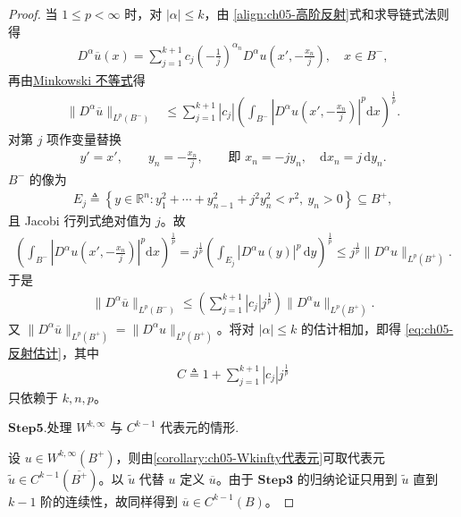 \documentclass[../../main.tex]{subfiles}
\begin{document}
\begin{proof}
当 $1\leqslant p<\infty$ 时，对 $|\alpha|\leqslant k$，由 \eqref{align:ch05-高阶反射}式和求导链式法则得
\begin{align}\label{HJKLVNLKAAA}
D^{\alpha}\overline{u}(x)=\sum_{j=1}^{k+1}c_j\left(-\frac{1}{j}\right)^{\alpha_n}
D^{\alpha}u\left(x',-\frac{x_n}{j}\right),\quad x\in B^{-},
\end{align}
再由\hyperref[Real Analysis-theorem:实变函数--Minkowski不等式]{Minkowski 不等式}得
\begin{align*}
\|D^{\alpha}\overline{u}\|_{L^{p}(B^{-})}
&\leqslant\sum_{j=1}^{k+1}|c_j|\left(\int_{B^{-}}\left|D^{\alpha}u\left(x',-\frac{x_n}{j}\right)\right|^{p}\mathrm{d}x\right)^{\frac{1}{p}}.
\end{align*}
对第 $j$ 项作变量替换
\begin{align*}
y'=x',\qquad y_n=-\frac{x_n}{j},\qquad\text{即 }x_n=-jy_n,\quad \mathrm{d}x_n=j\,\mathrm{d}y_n.
\end{align*}
$B^{-}$ 的像为
\begin{align*}
E_j\triangleq\left\{y\in\mathbb{R}^{n}:y_1^2+\cdots+y_{n-1}^2+j^2y_n^2<r^2,\ y_n>0\right\}\subseteq B^{+},
\end{align*}
且 Jacobi 行列式绝对值为 $j$。故
\begin{align*}
\left(\int_{B^{-}}\left|D^{\alpha}u\left(x',-\frac{x_n}{j}\right)\right|^{p}\mathrm{d}x\right)^{\frac{1}{p}}
=j^{\frac{1}{p}}\left(\int_{E_j}|D^{\alpha}u(y)|^{p}\,\mathrm{d}y\right)^{\frac{1}{p}}\leqslant j^{\frac{1}{p}}\|D^{\alpha}u\|_{L^{p}(B^{+})}.
\end{align*}
于是
\begin{align*}
\|D^{\alpha}\overline{u}\|_{L^{p}(B^{-})}
\leqslant\left(\sum_{j=1}^{k+1}|c_j|j^{\frac{1}{p}}\right)\|D^{\alpha}u\|_{L^{p}(B^{+})}.
\end{align*}
又 $\|D^{\alpha}\overline{u}\|_{L^{p}(B^{+})}=\|D^{\alpha}u\|_{L^{p}(B^{+})}$。将对 $|\alpha|\leqslant k$ 的估计相加，即得 \eqref{eq:ch05-反射估计}，其中
\begin{align*}
C\triangleq1+\sum_{j=1}^{k+1}|c_j|j^{\frac{1}{p}}
\end{align*}
只依赖于 $k,n,p$。

\noindent$\mathbf{Step}\bm{5}$.{\heiti 处理 $W^{k,\infty}$ 与 $C^{k-1}$ 代表元的情形.}

设 $u\in W^{k,\infty}(B^{+})$，则由\cref{corollary:ch05-Wkinfty代表元}可取代表元$\widetilde{u}\in C^{k-1}(\overline{B^{+}})$。以 $\widetilde{u}$ 代替 $u$ 定义 $\overline{u}$。由于 $\mathbf{Step}\bm{3}$ 的归纳论证只用到 $\widetilde{u}$ 直到 $k-1$ 阶的连续性，故同样得到 $\overline{u}\in C^{k-1}(B)$。


\end{proof}
\end{document}
